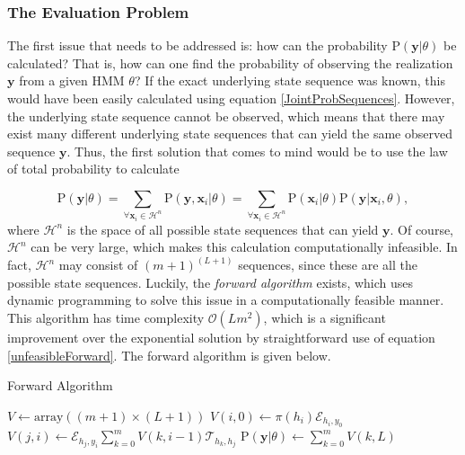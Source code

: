 \documentclass{article}\usepackage[]{graphicx}\usepackage[]{color}
\begin{document}
\subsubsection{The Evaluation Problem}
The first issue that needs to be addressed is: how can the probability $\text{P}(\mathbf{y}|\theta)$ be calculated? That is, how can one find the probability of observing the realization $\mathbf{y}$ from a given HMM $\theta$? If the exact underlying state sequence was known, this would have been easily calculated using equation \eqref{JointProbSequences}. However, the underlying state sequence cannot be observed, which means that there may exist many different underlying state sequences that can yield the same observed sequence $\mathbf{y}$. Thus, the first solution that comes to mind would be to use the law of total probability to calculate

\begin{equation}
    \text{P}(\textbf{y}|\theta) = \sum_{\forall\textbf{x}_i \in \mathcal{H}^n} \text{P}(\textbf{y}, \textbf{x}_i|\theta) = \sum_{\forall\textbf{x}_i \in \mathcal{H}^n} \text{P}(\mathbf{x}_i|\theta)\text{P}(\mathbf{y}|\mathbf{x}_i,\theta), 
\label{unfeasibleForward}
\end{equation}
where $\mathcal{H}^n$ is the space of all possible state sequences that can yield $\mathbf{y}$. Of course, $\mathcal{H}^n$ can be very large, which makes this calculation computationally infeasible. In fact, $\mathcal{H}^n$ may consist of $(m+1)^{(L+1)}$ sequences, since these are all the possible state sequences. Luckily, the \textit{forward algorithm} exists, which uses dynamic programming to solve this issue in a computationally feasible manner. This algorithm has time complexity $\mathcal{O}(Lm^2)$, which is a significant improvement over the exponential solution by straightforward use of equation \eqref{unfeasibleForward}. The forward algorithm is given below.  

\begin{algorithm}
    \caption{Forward Algorithm}\label{alg:Forward}
    \begin{algorithmic}
        \STATE $V \gets \text{array}((m+1) \times (L+1))$
            \STATE $V(i,0) \gets \pi(h_{i}) \mathcal{E}_{h_{i},y_0}$
        \ENDFOR
                \STATE $V(j,i) \gets \mathcal{E}_{h_{j}, y_i}\sum_{k=0}^{m}V(k, i-1)\mathcal{T}_{h_{k},h_{j}} $
            \ENDFOR
        \ENDFOR
        \RETURN $\text{P}(\mathbf{y}|\theta) \gets \sum_{k=0}^{m}V(k,L)$
    \end{algorithmic} 
\end{algorithm}
\end{document}
